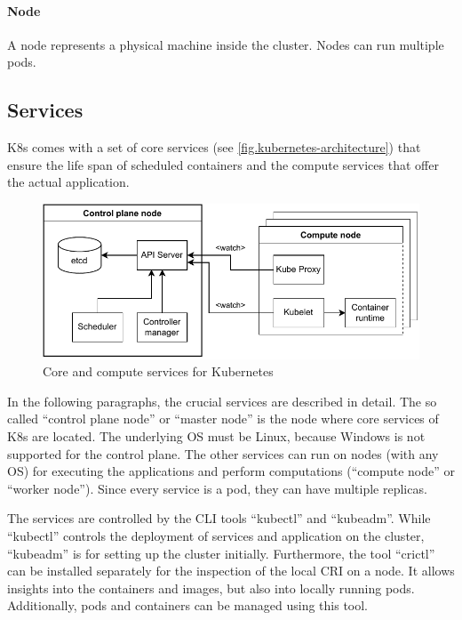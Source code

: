 \paragraph*{Node} A node represents a physical machine inside the cluster. Nodes can run multiple pods.


\subsection{Services}
\ac{K8s} comes with a set of core services (see \autoref{fig.kubernetes-architecture}) that ensure the life span of scheduled containers and the compute services that offer the actual application.
\begin{figure}[h]
	\centering
	\includegraphics[width=.95\textwidth]{Figures/kubernetes-architecture.pdf}
	\caption{Core and compute services for Kubernetes\cite{Luksa.2018}}
	\label{fig.kubernetes-architecture}
\end{figure}

In the following paragraphs, the crucial services are described in detail. The so called \enquote{control plane node} or \enquote{master node} is the node where core services of \ac{K8s} are located. The underlying \ac{OS} must be Linux, because \ac{Windows} is not supported for the control plane. The other services can run on nodes (with any \ac{OS}) for executing the applications and perform computations (\enquote{compute node} or \enquote{worker node}). Since every service is a pod, they can have multiple replicas.

The services are controlled by the \ac{CLI} tools \enquote{kubectl} and \enquote{kubeadm}. While \enquote{kubectl} controls the deployment of services and application on the cluster, \enquote{kubeadm} is for setting up the cluster initially.
Furthermore, the tool \enquote{crictl} can be installed separately for the inspection of the local \ac{CRI} on a node. It allows insights into the containers and images, but also into locally running pods. Additionally, pods and containers can be managed using this tool.

